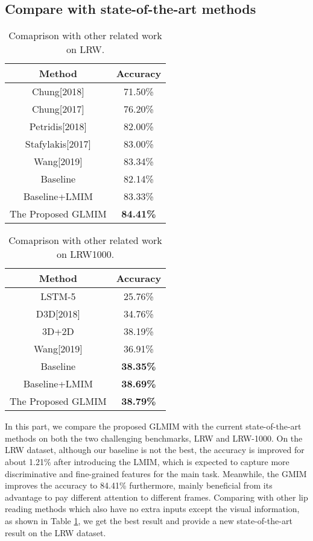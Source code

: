 \documentclass[a4paper, 10pt, conference]{ieeeconf}      \usepackage{FG2020}
\begin{document}
\subsection{Compare with state-of-the-art methods}
\begin{table}[t]
\setlength{\abovecaptionskip}{-0.2cm}   \caption{Comaprison with other related work on LRW.}
\label{table2}
\begin{center}
\begin{tabular}{|c||c|}
\hline
Method & Accuracy \\
\hline\hline
Chung[2018]\cite{chung2018learning} & 71.50\% \\
Chung[2017]\cite{chung2017lip} & 76.20\% \\
Petridis[2018]\cite{petridis2018end} & 82.00\% \\
Stafylakis[2017]\cite{stafylakis2017combining} & 83.00\% \\
Wang[2019]\cite{wang2019multi} & 83.34\% \\
\hline\hline
Baseline & 82.14\% \\
Baseline+LMIM & 83.33\% \\
The Proposed GLMIM & \textbf{84.41\%}\\
\hline
\end{tabular}
\end{center}
\end{table}
\begin{table}[t]
\setlength{\abovecaptionskip}{-0.2cm}   \caption{Comaprison with other related work on LRW1000.}
\label{table3}
\begin{center}
\begin{tabular}{|c||c|}
\hline
Method & Accuracy \\
\hline\hline
LSTM-5 & 25.76\% \\
D3D[2018]\cite{yang2018lrw} & 34.76\% \\
3D+2D & 38.19\%\\
Wang[2019]\cite{wang2019multi} & 36.91\% \\
\hline\hline
Baseline & \textbf{38.35\%} \\
Baseline+LMIM & \textbf{38.69\%} \\
The Proposed GLMIM & \textbf{38.79\%}\\
\hline
\end{tabular}
\end{center}
\end{table}
In this part, we compare the proposed GLMIM with the current state-of-the-art methods on both the two challenging benchmarks, LRW and LRW-1000. On the LRW dataset, although our baseline is not the best, the accuracy is improved for about 1.21\% after introducing the LMIM, which is expected to capture more discriminative and fine-grained features for the main task. Meanwhile, the GMIM improves the accuracy to 84.41\% furthermore, mainly beneficial from its advantage to pay different attention to different frames. Comparing with other lip reading methods which also have no extra inputs except the visual information, as shown in Table \ref{table2}, we get the best result and provide a new state-of-the-art result on the LRW dataset.
\end{document}

